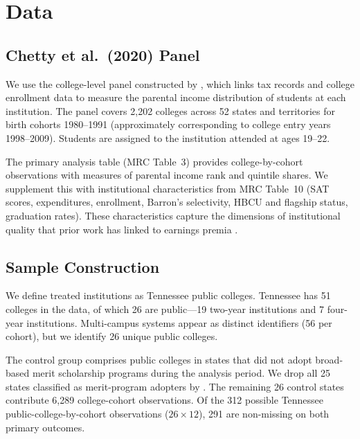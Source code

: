 
\section{Data}
\label{sec:data}

\subsection{Chetty et al.\ (2020) Panel}

We use the college-level panel constructed by
\textcite{chetty2020mobility}, which links tax records and college
enrollment data to measure the parental income distribution of students
at each institution. The panel covers 2,202 colleges across 52 states
and territories for birth cohorts 1980--1991 (approximately
corresponding to college entry years 1998--2009). Students are assigned
to the institution attended at ages 19--22.

The primary analysis table (MRC Table~3) provides college-by-cohort
observations with measures of parental income rank and quintile shares.
We supplement this with institutional characteristics from MRC Table~10
(SAT scores, expenditures, enrollment, Barron's selectivity, HBCU and
flagship status, graduation rates). These characteristics capture the
dimensions of institutional quality that prior work has linked to
earnings premia \parencite{brewer1999elite, dale2002selective}.

\subsection{Sample Construction}

We define treated institutions as Tennessee public colleges. Tennessee
has 51 colleges in the data, of which 26 are public---19 two-year
institutions and 7 four-year institutions. Multi-campus systems appear
as distinct identifiers (56 per cohort), but we identify 26 unique
public colleges.

The control group comprises public colleges in states that did not adopt
broad-based merit scholarship programs during the analysis period. We
drop all 25 states classified as merit-program adopters by
\textcite{sjoquist2015state}. The remaining 26 control states contribute
6,289 college-cohort observations. Of the 312 possible Tennessee
public-college-by-cohort observations ($26 \times 12$), 291 are
non-missing on both primary outcomes.

